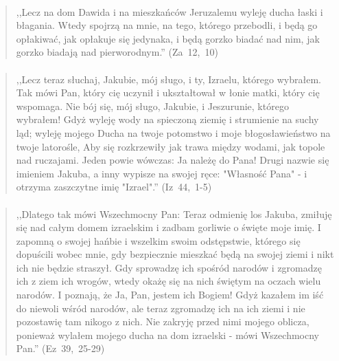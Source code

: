 \documentclass[10pt,a4paper,oneside]{article}
\begin{document}
\paragraph{}
\begin{quote}
,,Lecz na dom Dawida i na mieszkańców Jeruzalemu wyleję ducha łaski i błagania. Wtedy spojrzą na mnie, na tego, którego przebodli, i będą go opłakiwać, jak opłakuje się jedynaka, i będą gorzko biadać nad nim, jak gorzko biadają nad pierworodnym.'' \mbox{(Za 12, 10)}
\end{quote}
\paragraph{}
\begin{quote}
,,Lecz teraz słuchaj, Jakubie, mój sługo, i ty, Izraelu, którego wybrałem. Tak mówi Pan, który cię uczynił i ukształtował w łonie matki, który cię wspomaga. Nie bój się, mój sługo, Jakubie, i Jeszurunie, którego wybrałem! Gdyż wyleję wody na spieczoną ziemię i strumienie na suchy ląd; wyleję mojego Ducha na twoje potomstwo i moje błogosławieństwo na twoje latorośle, Aby się rozkrzewiły jak trawa między wodami, jak topole nad ruczajami. Jeden powie wówczas: Ja należę do Pana! Drugi nazwie się imieniem Jakuba, a inny wypisze na swojej ręce: "Własność Pana" - i otrzyma zaszczytne imię "Izrael".'' \mbox{(Iz 44, 1-5)}
\end{quote}
\paragraph{}
\begin{quote}
,,Dlatego tak mówi Wszechmocny Pan: Teraz odmienię los Jakuba, zmiłuję się nad całym domem izraelskim i zadbam gorliwie o święte moje imię. I zapomną o swojej hańbie i wszelkim swoim odstępstwie, którego się dopuścili wobec mnie, gdy bezpiecznie mieszkać będą na swojej ziemi i nikt ich nie będzie straszył. Gdy sprowadzę ich spośród narodów i zgromadzę ich z ziem ich wrogów, wtedy okażę się na nich świętym na oczach wielu narodów. I poznają, że Ja, Pan, jestem ich Bogiem! Gdyż kazałem im iść do niewoli wśród narodów, ale teraz zgromadzę ich na ich ziemi i nie pozostawię tam nikogo z nich. Nie zakryję przed nimi mojego oblicza, ponieważ wylałem mojego ducha na dom izraelski - mówi Wszechmocny Pan.'' \mbox{(Ez 39, 25-29)}
\end{quote}
\end{document}
